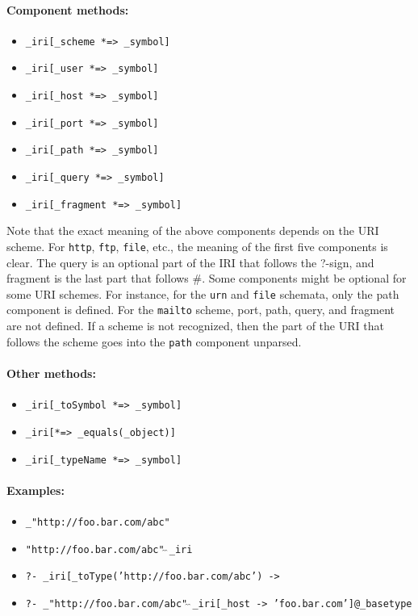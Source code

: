 \documentclass[11pt]{article}
\begin{document}
\paragraph{Component methods:}
\begin{itemize}
\item
  {\tt \_iri[\_scheme *=> \_symbol]}
\item
  {\tt \_iri[\_user *=> \_symbol]}
\item
  {\tt \_iri[\_host *=> \_symbol]}
\item
  {\tt \_iri[\_port *=> \_symbol]}
\item
  {\tt \_iri[\_path *=> \_symbol]}
\item
  {\tt \_iri[\_query *=> \_symbol]}
\item
  {\tt \_iri[\_fragment *=> \_symbol]}
\end{itemize}
Note that the exact meaning of the above components depends on the URI
scheme. For {\tt http}, {\tt ftp}, {\tt file}, etc., the meaning of
the first five components is clear. The query is an optional part of the
IRI that follows the ?-sign, and fragment is the last part that
follows \#.  Some components might be optional for some URI
schemes.  For instance, for the {\tt urn}  and {\tt file}  schemata,
only the path component is defined.  For the {\tt mailto}  scheme, port,
path, query, and fragment are not defined.  If a scheme is not recognized,
then the part of the URI that follows the scheme goes into the
{\tt path}  component unparsed.

\paragraph{Other methods:}
\begin{itemize}
\item  {\tt \_iri[\_toSymbol *=> \_symbol]}  
\item  {\tt \_iri[*=> \_equals(\_object)]}   
\item  {\tt \_iri[\_typeName *=> \_symbol]}   
\end{itemize}

\paragraph{Examples:}
\begin{itemize}
\item      {\tt \_"http://foo.bar.com/abc"} 
\item      {\tt "http://foo.bar.com/abc"$\hat{~}\hat{~}$\_iri} 
\item      {\tt ?- \_iri[\_toType('http://foo.bar.com/abc') ->}\\
  \hspace*{5cm}{\tt "http://foo.bar.com/abc"$\hat{~}\hat{~}$\_iri]@\_basetype}  
\item      {\tt ?- \_"http://foo.bar.com/abc"$\hat{~}\hat{~}$\_iri[\_host -> 'foo.bar.com']@\_basetype}  
\end{itemize}
\end{document}
